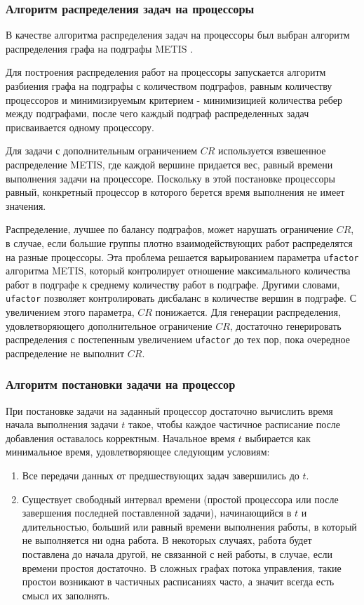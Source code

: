 \subsubsection{Алгоритм распределения задач на процессоры} \label{METIS}
В качестве алгоритма распределения задач на процессоры был выбран алгоритм распределения графа на подграфы METIS \cite{Karypis2011}.

Для построения распределения работ на процессоры запускается алгоритм разбиения графа на подграфы с количеством подграфов, равным количеству процессоров и минимизируемым критерием - минимизицией количества ребер между подграфами, после чего каждый подграф распределенных задач присваивается одному процессору.

Для задачи с дополнительным ограничением $CR$ используется взвешенное распределение METIS, где каждой вершине придается вес, равный времени выполнения задачи на процессоре. Поскольку в этой постановке процессоры равный, конкретный процессор в которого берется время выполнения не имеет значения.

Распределение, лучшее по балансу подграфов, может нарушать ограничение $CR$, в случае, если большие группы плотно взаимодействующих работ распределятся на разные процессоры. Эта проблема решается варьированием параметра \texttt{ufactor} алгоритма METIS, который контролирует отношение максимального количества работ в подграфе к среднему количеству работ в подграфе. Другими словами, \texttt{ufactor} позволяет контролировать дисбаланс в количестве вершин в подграфе. С увеличением этого параметра, $CR$ понижается. Для генерации распределения, удовлетворяющего дополнительное ограничение $CR$, достаточно генерировать распределения с постепенным увеличением \texttt{ufactor} до тех пор, пока очередное распределение не выполнит $CR$.

\subsubsection{Алгоритм постановки задачи на процессор} \label{gap_filling}
При постановке задачи на заданный процессор достаточно вычислить время начала выполнения задачи $t$ такое, чтобы каждое частичное расписание после добавления оставалось корректным. Начальное время $t$ выбирается как минимальное время, удовлетворяющее следующим условиям:
\begin{enumerate}
    \item Все передачи данных от предшествующих задач завершились до $t$.
    \item Существует свободный интервал времени (простой процессора или после завершения последней поставленной задачи), начинающийся в $t$ и длительностью, больший или равный времени выполнения работы, в который не выполняется ни одна работа. В некоторых случаях, работа будет поставлена до начала другой, не связанной с ней работы, в случае, если времени простоя достаточно. В сложных графах потока управления, такие простои возникают в частичных расписаниях часто, а значит всегда есть смысл их заполнять.
\end{enumerate}


